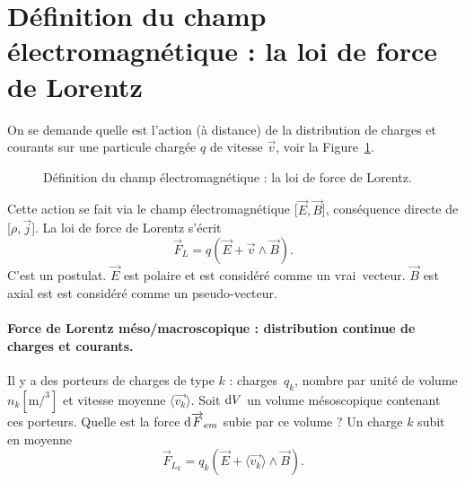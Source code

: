 \section[La loi de force de Lorentz]{Définition du champ électromagnétique : la loi de force de Lorentz}

    On se demande quelle est l'action (à distance) de la distribution de charges et courants sur une particule chargée $q$ de vitesse $\vec{v}$, voir la Figure~\ref{fig:definition_champ_em_loi_force_lorentz}.

    \begin{figure}
        \centering
        \caption{Définition du champ électromagnétique : la loi de force de Lorentz.}    
        \label{fig:definition_champ_em_loi_force_lorentz}
    \end{figure}

    Cette action se fait via le champ électromagnétique [$\vec{E},\vec{B}$], conséquence directe de [$\rho,\vec{j}$]. La loi de force de Lorentz s'écrit
    \begin{equation*}
        \boxed{
            \vec{F}_L = q\left(\vec{E}+\vec{v}\wedge\vec{B}\right).
        }
    \end{equation*}
    C'est un postulat. $\vec{E}$ est polaire et est considéré comme un \og vrai\fg~vecteur. $\vec{B}$ est axial est est considéré comme un \og pseudo-vecteur\fg.

    \paragraph{Force de Lorentz méso/macroscopique : distribution continue de charges et courants.}

        Il y a des porteurs de charges de type $k$ : charges~$q_k$, nombre par unité de volume $n_k [\si{\metre\per\cubed}]$ et vitesse moyenne $\langle\vec{v_k}\rangle$. Soit $\mathrm{d} V$ un volume mésoscopique contenant ces porteurs. Quelle est la force $\mathrm{d}\protect\overrightarrow{{F}}_{em}$ subie par ce volume ? Un charge $k$ subit en moyenne 
        \begin{equation*}
            \vec{F}_{L_k}=q_k\left(\vec{E}+\langle\vec{v_k}\rangle\wedge \vec{B}\right).
        \end{equation*}

